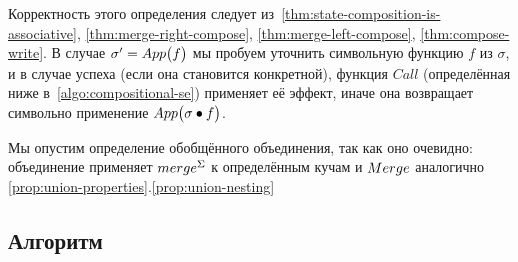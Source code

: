 Корректность этого определения следует из~\autoref{thm:state-composition-is-associative}, \autoref{thm:merge-right-compose}, \autoref{thm:merge-left-compose}, \autoref{thm:compose-write}. В случае $\sigma'=App\big(f\big)$ мы пробуем уточнить символьную функцию $f$ из $\sigma$, и в случае успеха (если она становится конкретной), функция $Call$ (определённая ниже в~\autoref{algo:compositional-se}) применяет её эффект, иначе она возвращает символьно применение $App\big(\sigma\bullet f\big)$.

Мы опустим определение обобщённого объединения, так как оно очевидно: объединение применяет $merge^\Sigma$ к определённым кучам и  $Merge$ аналогично \autoref{prop:union-properties}.\ref{prop:union-nesting}

\subsection{Алгоритм}

